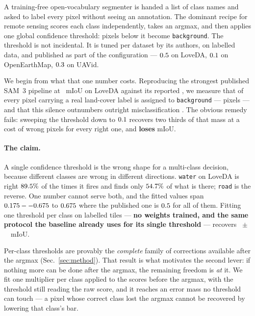 \documentclass[10pt,twocolumn,letterpaper]{article}          %
\newcommand{\best}[1]{\textbf{#1}}
\newcommand{\bg}{\texttt{background}}
\begin{document}
A training-free open-vocabulary segmenter is handed a list of class names and asked
to label every pixel without seeing an annotation. The dominant recipe for remote
sensing scores each class independently, takes an argmax, and then applies one global
confidence threshold: pixels below it become \bg{}. The threshold is not incidental.
It is tuned per dataset by its authors, on labelled data, and published as part of the
configuration --- $0.5{}$ on LoveDA, $0.1{}$ on OpenEarthMap, $0.3{}$ on UAVid.

We begin from what that one number costs. Reproducing the strongest published SAM~3
pipeline at \loveBase{}~mIoU on LoveDA against its reported \lovePub{}, we measure
that \discardPct{} of every pixel carrying a real land-cover label is assigned to
\bg{} --- \discardPx{} pixels --- and that this silence outnumbers outright
misclassification \discardRatio{}. The obvious remedy fails: sweeping the threshold
down to $0.1{}$ recovers two thirds of that mass at a cost of \tauRatio{} wrong pixels
for every right one, and \best{loses} mIoU.

\paragraph{The claim.} A single confidence threshold is the wrong shape for a
multi-class decision, because different classes are wrong in different directions.
\texttt{water} on LoveDA is right $89.5{}\%$ of the times it fires and finds only
$54.7{}\%$ of what is there; \texttt{road} is the reverse. One number cannot serve
both, and the fitted values span $0.175--0.675{}$ to $0.675{}$ where the published one is $0.5{}$
for all of them. Fitting one threshold per class on \calibTiles{} labelled tiles ---
\best{no weights trained, and the same protocol the baseline already uses for its
single threshold} --- recovers \methodGain{}~$\pm$~\methodSD{}~mIoU.

Per-class thresholds are provably the \emph{complete} family of corrections available
after the argmax (Sec.~\ref{sec:method}). That result is what motivates the second
lever: if nothing more can be done after the argmax, the remaining freedom is
\emph{at} it. We fit one multiplier per class applied to the scores before the argmax,
with the threshold still reading the raw score, and it reaches an error mass no
threshold can touch --- a pixel whose correct class lost the argmax cannot be
recovered by lowering that class's bar.
\end{document}
